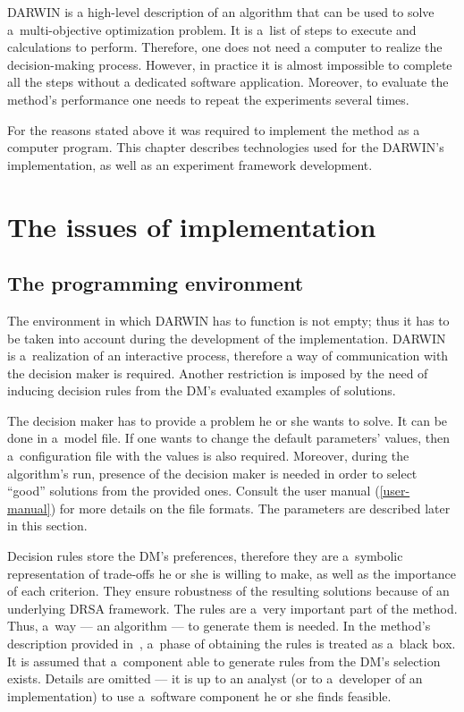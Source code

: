 DARWIN is a high-level description of an algorithm that can be used to solve
a~multi-objective optimization problem. It is a~list of steps to execute and
calculations to perform. Therefore, one does not need a computer to realize
the decision-making process. However, in practice it is almost impossible to
complete all the steps without a dedicated software application. Moreover, to
evaluate the method's performance one needs to repeat the experiments several
times.

For the reasons stated above it was required to implement the method as a
computer program. This chapter describes technologies used for the DARWIN's
implementation, as well as an experiment framework development.

\section{The issues of implementation}

\subsection{The programming environment}
\label{environ}

The environment in which DARWIN has to function is not empty; thus it has to
be taken into account during the development of the implementation. DARWIN is
a~realization of an interactive process, therefore a way of communication with
the decision maker is required. Another restriction is imposed by the need of
inducing decision rules from the DM's evaluated examples of solutions.

The decision maker has to provide a problem he or she wants to solve. It can
be done in a~model file. If one wants to change the default parameters'
values, then a~configuration file with the values is also required. Moreover,
during the algorithm's run, presence of the decision maker is needed in order
to select ``good'' solutions from the provided ones. Consult the user manual
(\ref{user-manual}) for more details on the file formats. The parameters are
described later in this section.

Decision rules store the DM's preferences, therefore they are a~symbolic
representation of trade-offs he or she is willing to make, as well as the
importance of each criterion. They ensure robustness of the resulting
solutions because of an underlying DRSA framework. The rules are a~very
important part of the method. Thus, a~way --- an algorithm --- to generate
them is needed. In the method's description provided in~\cite{GMS10, GMS10b,
  GMS10c}, a~phase of obtaining the rules is treated as a~black box. It is
assumed that a~component able to generate rules from the DM's selection
exists. Details are omitted --- it is up to an analyst (or to a~developer of
an implementation) to use a~software component he or she finds feasible.


